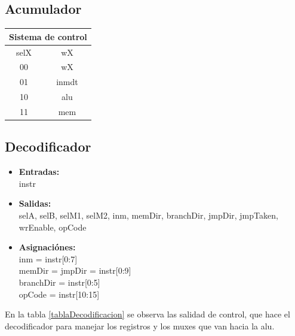 \documentclass[paper=letter, fontsize=12pt]{article}
\begin{document}
\subsection{Acumulador}

\begin{table}[h]
\centering
\begin{tabular}{c|c}
\multicolumn{2}{c}{Sistema de control} \\ \hline
selX   & wX    \\ \hline
00     & wX    \\
01     & inmdt \\
10     & alu   \\
11     & mem   \\
\end{tabular}
\end{table}


\pagebreak
\subsection{Decodificador}

\begin{itemize}
\item \textbf{Entradas:}\\
instr
\item \textbf{Salidas:}\\
selA, selB, selM1, selM2, inm, memDir, branchDir, jmpDir, jmpTaken, wrEnable, opCode
\item \textbf{Asignaciónes:} \\
inm = instr[0:7] \\
memDir = jmpDir = instr[0:9] \\
branchDir = instr[0:5] \\
opCode = instr[10:15]
\end{itemize}

En la tabla \ref{tablaDecodificacion} se observa las salidad de control, que hace el decodificador para manejar los registros y los muxes que van hacia la alu.
\end{document}
